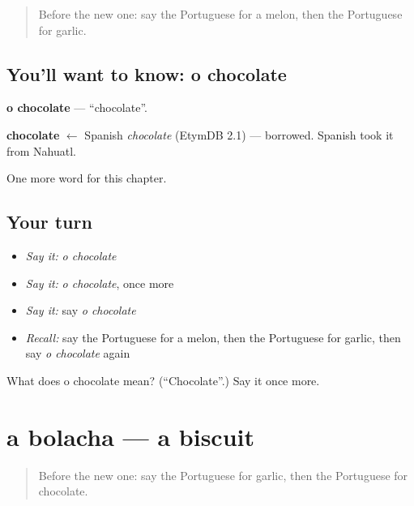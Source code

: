 \label{lesson:PT-C106-chocolate}



\begin{quote}
Before the new one: say the Portuguese for a melon, then the Portuguese for garlic.
\end{quote}

\subsection*{You'll want to know: o chocolate}
\textbf{o chocolate} — \textquotedblleft{}chocolate\textquotedblright{}.

\begin{cousinweb}
\textbf{chocolate} $\leftarrow$ Spanish \emph{chocolate} (EtymDB 2.1) — borrowed. Spanish took it from Nahuatl.
\end{cousinweb}

\begin{grammarlens}[title={What you've built}]
One more word for this chapter.
\end{grammarlens}

\subsection*{Your turn}
\begin{itemize}
\raggedright
  \item \emph{Say it:} \emph{o chocolate}
  \item \emph{Say it:} \emph{o chocolate}, once more
  \item \emph{Say it:} say \emph{o chocolate}
  \item \emph{Recall:} say the Portuguese for a melon, then the Portuguese for garlic, then say \emph{o chocolate} again
\end{itemize}

\begin{tcolorbox}[breakable,colback=teal!4,colframe=teal!35!black,title={Before you move on}]
What does o chocolate mean? (\textquotedblleft{}Chocolate\textquotedblright{}.) Say it once more.
\end{tcolorbox}
\section[a bolacha]{a bolacha — a biscuit}

\label{lesson:PT-C106-bolacha}



\begin{quote}
Before the new one: say the Portuguese for garlic, then the Portuguese for chocolate.
\end{quote}

